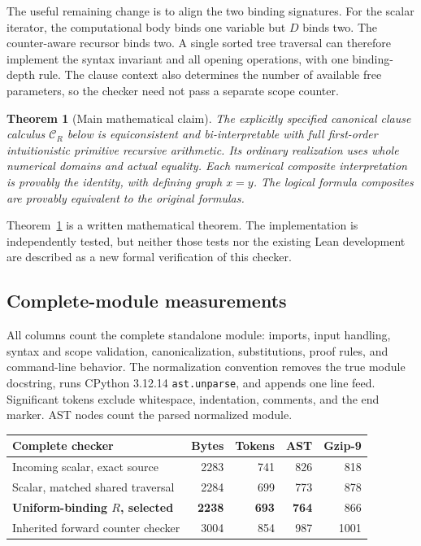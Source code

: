 \documentclass[10pt,letterpaper]{article}
\newtheorem{theorem}{Theorem}[section]
\theoremstyle{definition}
\theoremstyle{remark}
\newcommand{\CR}{\mathcal C_R}
\begin{document}
The useful remaining change is to align the two binding signatures.
For the scalar iterator, the computational body binds one variable but
$D$ binds two. The counter-aware recursor binds two. A single sorted
tree traversal can therefore implement the syntax invariant and all
opening operations, with one binding-depth rule. The clause context also
determines the number of available free parameters, so the checker need
not pass a separate scope counter.

\begin{theorem}[Main mathematical claim]\label{thm:main}
The explicitly specified canonical clause calculus $\CR$ below is
equiconsistent and bi-interpretable with full first-order intuitionistic
primitive recursive arithmetic. Its ordinary realization uses whole
numerical domains and actual equality. Each numerical composite
interpretation is provably the identity, with defining graph $x=y$.
The logical formula composites are provably equivalent to the original
formulas.
\end{theorem}

Theorem~\ref{thm:main} is a written mathematical theorem. The implementation
is independently tested, but neither those tests nor the existing Lean
development are described as a new formal verification of this checker.

\subsection{Complete-module measurements}

All columns count the complete standalone module: imports, input handling,
syntax and scope validation, canonicalization, substitutions, proof rules,
and command-line behavior. The normalization convention removes the true
module docstring, runs CPython 3.12.14 \texttt{ast.unparse}, and appends one
line feed. Significant tokens exclude whitespace, indentation, comments,
and the end marker. AST nodes count the parsed normalized module.

\begin{center}
\small
\begin{tabular}{@{}lrrrr@{}}
\toprule
Complete checker & Bytes & Tokens & AST & Gzip-9\\
\midrule
Incoming scalar, exact source & 2283 & 741 & 826 & 818\\
Scalar, matched shared traversal & 2284 & 699 & 773 & 878\\
\textbf{Uniform-binding $R$, selected} & \textbf{2238} & \textbf{693} & \textbf{764} & 866\\
Inherited forward counter checker & 3004 & 854 & 987 & 1001\\
\bottomrule
\end{tabular}
\end{center}
\end{document}
